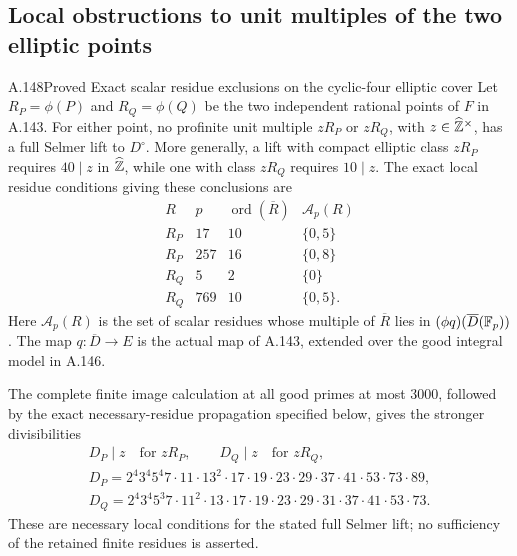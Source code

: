 \subsection{Local obstructions to unit multiples of the two elliptic points}

\begin{statement}{A.148}{Proved}
{Exact scalar residue exclusions on the cyclic-four elliptic cover}
Let \(R_P=\phi(P)\) and \(R_Q=\phi(Q)\) be the two
independent rational points of \(F\) in A.143.
For either point, no profinite unit multiple
\(zR_P\) or \(zR_Q\), with \(z\in\widehat{\mathbb Z}^\times\),
has a full Selmer lift to \(D^\circ\).
More generally, a lift with compact elliptic class \(zR_P\)
requires \(40\mid z\) in \(\widehat{\mathbb Z}\), while one with
class \(zR_Q\) requires \(10\mid z\).
The exact local residue conditions giving these conclusions are
\[
 \begin{array}{c|r|r|l}
 R&p&\operatorname{ord}(\overline R)&\mathcal A_p(R)\\ \hline
 R_P&17&10&\{0,5\}\\
 R_P&257&16&\{0,8\}\\
 R_Q&5&2&\{0\}\\
 R_Q&769&10&\{0,5\}.
 \end{array}
\tag{A.148.1}
\]
Here \(\mathcal A_p(R)\) is the set of scalar residues whose
multiple of \(\overline R\) lies in
\((\phi q)(\overline D(\mathbb F_p))\).
The map \(q:\overline D\to E\) is the actual map of A.143,
extended over the good integral model in A.146.

The complete finite image calculation at all good primes at most
\(3000\), followed by the exact necessary-residue propagation
specified below, gives the stronger divisibilities
\[
 \begin{aligned}
 D_P\mid z\quad\text{for }zR_P,\qquad
 D_Q\mid z\quad\text{for }zR_Q,\\
 D_P=2^4 3^4 5^4 7\cdot11\cdot13^2\cdot17\cdot19
              \cdot23\cdot29\cdot37\cdot41\cdot53\cdot73\cdot89,\\
 D_Q=2^4 3^4 5^3 7\cdot11^2\cdot13\cdot17\cdot19
              \cdot23\cdot29\cdot31\cdot37\cdot41\cdot53\cdot73.
 \end{aligned}
\tag{A.148.2}
\]
These are necessary local conditions for the stated full Selmer
lift; no sufficiency of the retained finite residues is asserted.
\end{statement}

